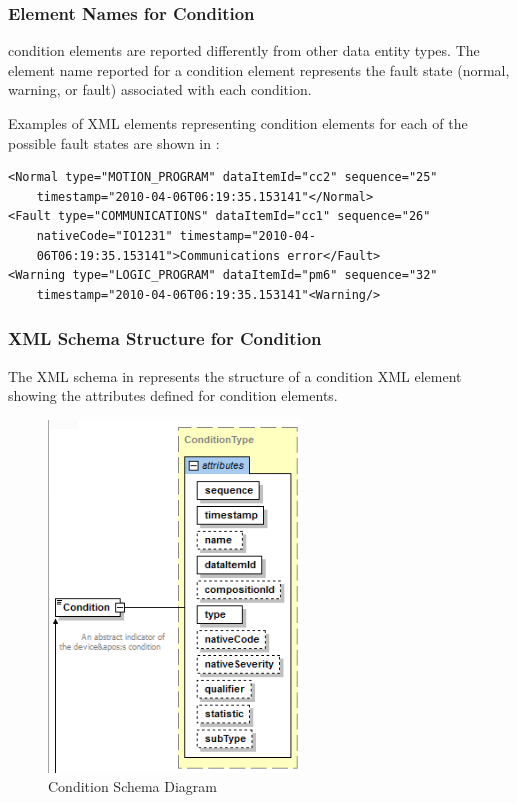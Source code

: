 \documentclass{mtconnect}	%
\begin{document}
\subsubsection{Element Names for Condition}\label{sec:Element Names for Condition}

\gls{condition} elements are reported differently from other \gls{data entity} \glspl{type}.  The \gls{element name} reported for a \gls{condition} element represents the \gls{fault state} (\gls{normal}, \gls{warning}, or \gls{fault}) associated with each \gls{condition}.

Examples of XML elements representing \gls{condition} elements for each of the possible \glspl{fault state} are shown in :

\begin{lstlisting}[firstnumber=1,escapechar=|,%
    caption={Example of Condition Element Fault States},label={lst:example-of-condition-element-fault-states}]
<Normal type="MOTION_PROGRAM" dataItemId="cc2" sequence="25"
    timestamp="2010-04-06T06:19:35.153141"</Normal>
<Fault type="COMMUNICATIONS" dataItemId="cc1" sequence="26"
    nativeCode="IO1231" timestamp="2010-04-
    06T06:19:35.153141">Communications error</Fault>
<Warning type="LOGIC_PROGRAM" dataItemId="pm6" sequence="32"
    timestamp="2010-04-06T06:19:35.153141"<Warning/>
\end{lstlisting}

\subsubsection{XML Schema Structure for Condition}

The XML schema in  represents the structure of a \gls{condition} XML element showing the attributes defined for \gls{condition} elements.

\begin{figure}[ht]
  \centering
  \includegraphics[width=0.6\textwidth]{figures/condition-schema-diagram.png}
  \caption{Condition Schema Diagram}
  \label{fig:condition-schema-diagram}
\end{figure}
\FloatBarrier
\end{document}
